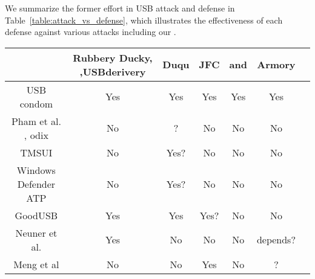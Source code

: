 We summarize the former effort in USB attack and defense in Table~\ref{table:attack_vs_defense}, which illustrates the effectiveness of each defense against various attacks including our \tool.
\begin{table*}
	\centering
	\begin{tabular}{|c|c|c|c|c|c|c|}
		
		
		\hline
		\diagbox {Defence}{Attack} & Rubbery Ducky\cite{rubber}, \cite{rubberducky2020},USBderivery\cite{usbdriver} & Duqu\cite{duqu} & JFC\cite{JFCImpact}&\cite{smartphone}\cite{poweremi} and \cite{usbdriver}& Armory\\
		
		\hline 
		USB condom \cite{Condom}& Yes & Yes & Yes & Yes & Yes\\
		\hline 
		Pham et al. \cite{pham2010optimizing}, odix\cite{OLEA}& No & ? & No & No & No\\
		\hline 
		TMSUI\cite{yang2015tmsui}& No & Yes? & No & No & No\\
		\hline 
		Windows Defender ATP\cite{windenfenderwhite}& No & Yes? & No & No & No\\
		\hline 
		GoodUSB\cite{tian2015defending}& Yes & Yes & Yes? & No & No \\

		\hline
		Neuner et al.\cite{neuner2018usblock}& Yes & No & No & No & depends? \\
		\hline
		Meng et al\cite{meng2018252}& No & No & Yes & No & ?\\
		\hline
	\end{tabular}
	\linebreak
	\caption{Effectiveness of defense against different attacks}
	\label{table:attack_vs_defense}
\end{table*}




